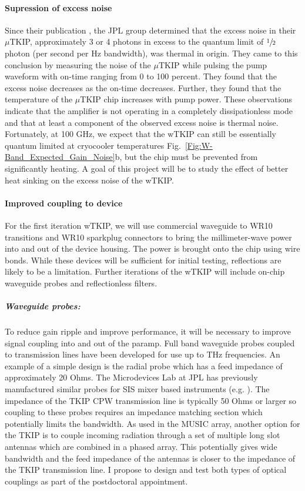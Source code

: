 \paragraph*{Supression of excess noise}
Since their publication \cite{Eom2012}, the JPL group determined that the excess noise in their $\mu$TKIP, approximately 3 or 4 photons in excess to the quantum limit of $\sfrac{1}{2}$ photon (per second per Hz bandwidth), was thermal in origin. They came to this conclusion by measuring the noise of the $\mu$TKIP while pulsing the pump waveform with on-time ranging from 0 to 100 percent.  They found that the excess noise decreases as the on-time decreases. Further, they found that the temperature of the $\mu$TKIP chip increases with pump power. These observations indicate that the amplifier is not operating in a completely dissipationless mode and that at least a component of the observed excess noise is thermal noise. Fortunately, at 100 GHz, we expect that the wTKIP can still be essentially quantum limited at cryocooler temperatures Fig.~\ref{Fig:W-Band_Expected_Gain_Noise}b, but the chip must be prevented from significantly heating. A goal of this project will be to study the effect of better heat sinking on the excess noise of the wTKIP.


\paragraph*{Improved coupling to device} For the first iteration wTKIP, we will use commercial waveguide to WR10 transitions and WR10 sparkplug connectors to bring the millimeter-wave power into and out of the device housing. The power is brought onto the chip using wire bonds. While these devices will be sufficient for initial testing, reflections are likely to be a limitation. Further iterations of the wTKIP will include on-chip waveguide probes and reflectionless filters.


\subparagraph*{Waveguide probes:} To reduce gain ripple and improve performance, it will be necessary to improve signal coupling into and out of the paramp. Full band waveguide probes coupled to transmission lines have been developed for use up to THz frequencies. An example of a simple design is the radial probe \cite{Withington1996} which has a feed impedance of approximately 20 Ohms. The Microdevices Lab at JPL has previously manufactured similar probes for SIS mixer based instruments (e.g. \cite{Kooi2003}). The impedance of the TKIP CPW transmission line is typically 50 Ohms or larger so coupling to these probes requires an impedance matching section which potentially limits the bandwidth. As used in the MUSIC \cite{Golwala2012} array, another option for the TKIP is to couple incoming radiation through a set of multiple long slot antennas which are combined in a phased array. This potentially gives wide bandwidth and the feed impedance of the antennas is closer to the impedance of the TKIP transmission line. I propose to design and test both types of optical couplings as part of the postdoctoral appointment.

